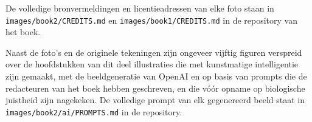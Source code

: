 De volledige bronvermeldingen en licentieadressen van elke foto staan
in \texttt{images/\allowbreak book2/\allowbreak CREDITS.md} en
\texttt{images/\allowbreak book1/\allowbreak CREDITS.md} in de repository van het boek.

\bigskip
Naast de foto's en de originele tekeningen zijn ongeveer vijftig
figuren verspreid over de hoofdstukken van dit deel illustraties die
met kunstmatige intelligentie zijn gemaakt, met de beeldgeneratie van
OpenAI en op basis van prompts die de redacteuren van het boek hebben
geschreven, en die vóór opname op biologische juistheid zijn
nagekeken. De volledige prompt van elk gegenereerd beeld staat in
\texttt{images/\allowbreak book2/\allowbreak ai/\allowbreak PROMPTS.md} in de repository.
\par\endgroup
\clearpage
